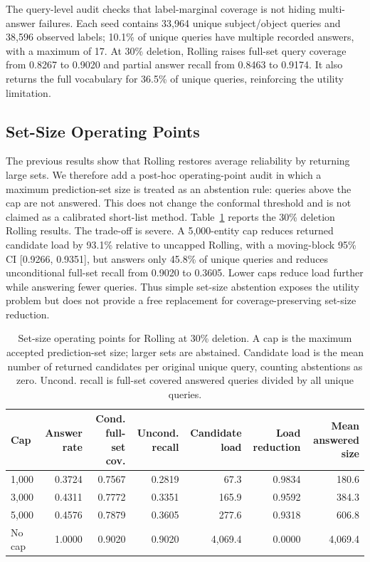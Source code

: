 \documentclass[10pt,twocolumn]{article}
\begin{document}
The query-level audit checks that label-marginal coverage is not hiding
multi-answer failures. Each seed contains 33,964 unique subject/object queries
and 38,596 observed labels; 10.1\% of unique queries have multiple recorded
answers, with a maximum of 17. At 30\% deletion, Rolling raises full-set query
coverage from 0.8267 to 0.9020 and partial answer recall from 0.8463 to 0.9174.
It also returns the full vocabulary for 36.5\% of unique queries, reinforcing
the utility limitation.

\subsection{Set-Size Operating Points}

The previous results show that Rolling restores average reliability by
returning large sets. We therefore add a post-hoc operating-point audit in which
a maximum prediction-set size is treated as an abstention rule: queries above
the cap are not answered. This does not change the conformal threshold and is
not claimed as a calibrated short-list method. Table~\ref{tab:set-size-utility}
reports the 30\% deletion Rolling results. The trade-off is severe. A
5,000-entity cap reduces returned candidate load by 93.1\% relative to uncapped
Rolling, with a moving-block 95\% CI [0.9266, 0.9351], but answers only 45.8\%
of unique queries and reduces unconditional full-set recall from 0.9020 to
0.3605. Lower caps reduce load further while answering fewer queries. Thus
simple set-size abstention exposes the utility problem but does not provide a
free replacement for coverage-preserving set-size reduction.

\begin{table}[t]
\centering
\caption{Set-size operating points for Rolling at 30\% deletion. A cap is the
maximum accepted prediction-set size; larger sets are abstained. Candidate load
is the mean number of returned candidates per original unique query, counting
abstentions as zero. Uncond. recall is full-set covered answered queries divided
by all unique queries.}
\label{tab:set-size-utility}
\footnotesize
\setlength{\tabcolsep}{4pt}
\begin{tabular}{lrrrrrr}
\toprule
Cap & Answer rate & Cond. full-set cov. & Uncond. recall & Candidate load & Load reduction & Mean answered size\\
\midrule
1,000 & 0.3724 & 0.7567 & 0.2819 & 67.3 & 0.9834 & 180.6\\
3,000 & 0.4311 & 0.7772 & 0.3351 & 165.9 & 0.9592 & 384.3\\
5,000 & 0.4576 & 0.7879 & 0.3605 & 277.6 & 0.9318 & 606.8\\
No cap & 1.0000 & 0.9020 & 0.9020 & 4,069.4 & 0.0000 & 4,069.4\\
\bottomrule
\end{tabular}
\end{table}
\end{document}
